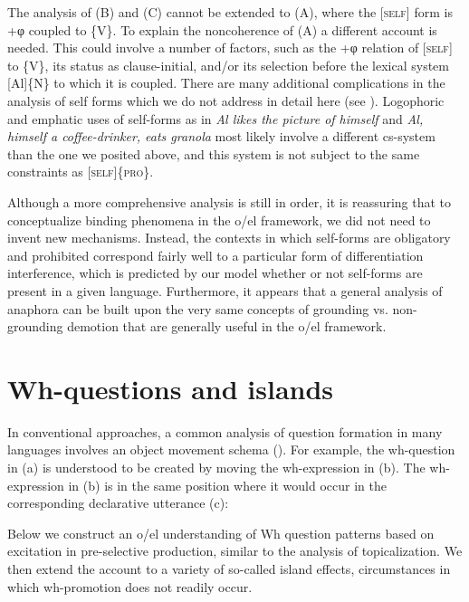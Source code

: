   The analysis of (B) and (C) cannot be extended to (A), where the [\textsc{self}] form is +φ coupled to \{V\}. To explain the noncoherence of (A) a different account is needed. This could involve a number of factors, such as the +φ relation of [\textsc{self}] to \{V\}, its status as clause-initial, and/or its selection before the lexical system [Al]\{N\} to which it is coupled. There are many additional complications in the analysis of self forms which we do not address in detail here (see \citealt{KönigSiemund2000,Safir2004}). Logophoric and emphatic uses of self-forms as in \textit{Al likes the picture of himself} and \textit{Al, himself a coffee-drinker, eats granola} most likely involve a different cs-system than the one we posited above, and this system is not subject to the same constraints as [\textsc{self}]\{\textsc{pro}\}. 

  Although a more comprehensive analysis is still in order, it is reassuring that to conceptualize binding phenomena in the o/el framework, we did not need to invent new mechanisms. Instead, the contexts in which self-forms are obligatory and prohibited correspond fairly well to a particular form of differentiation interference, which is predicted by our model whether or not self-forms are present in a given language. Furthermore, it appears that a general analysis of anaphora can be built upon the very same concepts of grounding vs. non-grounding demotion that are generally useful in the o/el framework.

\section{Wh-questions and islands}

In conventional approaches, a common analysis of question formation in many languages involves an object movement schema (\citealt{Baker1970,Cheng1997,Chomsky1965,Karttunen1977}). For example, the wh-question in (a) is understood to be created by moving the wh-expression in (b). The wh-expression in (b) is in the same position where it would occur in the corresponding declarative utterance (c):

\ea
{}
\z
\z

  Below we construct an o/el understanding of Wh question patterns based on excitation in pre-selective production, similar to the analysis of topicalization. We then extend the account to a variety of so-called island effects, circumstances in which wh-promotion does not readily occur. 

